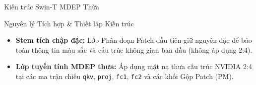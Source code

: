 \documentclass[aspectratio=169, 10pt]{beamer}
\begin{document}
\begin{frame}{Kiến trúc Swin-T MDEP Thừa}
\begin{tikzpicture}
  \end{tikzpicture}
  
  \vspace{0.3cm}
  \begin{block}{Nguyên lý Tích hợp \& Thiết lập Kiến trúc}
    \begin{itemize}
      \item \textbf{Stem tích chập đặc:} Lớp Phân đoạn Patch đầu tiên giữ nguyên đặc để bảo toàn thông tin màu sắc và cấu trúc không gian ban đầu (không áp dụng 2:4).
      \item \textbf{Lớp tuyến tính MDEP thưa:} Áp dụng mặt nạ thưa cấu trúc NVIDIA 2:4 tại các ma trận chiếu \texttt{qkv}, \texttt{proj}, \texttt{fc1}, \texttt{fc2} và các khối Gộp Patch (PM).
    \end{itemize}
  \end{block}
\end{frame}
\end{document}
